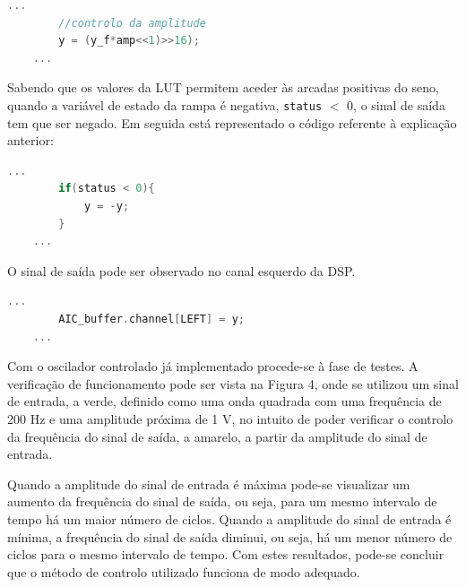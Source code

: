 \documentclass[11pt]{article}
\numberwithin{equation}{section}
\begin{document}
\begin{lstlisting}[language=C]
	...
		//controlo da amplitude
		y = (y_f*amp<<1)>>16);
	...
\end{lstlisting}

Sabendo que os valores da LUT permitem aceder às arcadas positivas do seno, quando a variável de estado da rampa é negativa, \texttt{status} $<$ 0, o sinal de saída tem que ser negado. Em seguida está representado o código referente à explicação anterior:

\begin{lstlisting}[language=C]
	...
		if(status < 0){
			y = -y;
		}
	...
\end{lstlisting}

O sinal de saída pode ser observado no canal esquerdo da DSP.

\begin{lstlisting}[language=C]
	...
		AIC_buffer.channel[LEFT] = y;
	...
\end{lstlisting}

Com o oscilador controlado já implementado procede-se à fase de testes. A verificação de funcionamento pode ser vista na Figura 4, onde se utilizou um sinal de entrada, a verde, definido como uma onda quadrada com uma frequência de 200 Hz e uma amplitude próxima de 1 V, no intuito de poder verificar o controlo da frequência do sinal de saída, a amarelo, a partir da amplitude do sinal de entrada. 

Quando a amplitude do sinal de entrada é máxima pode-se visualizar um aumento da frequência do sinal de saída, ou seja, para um mesmo intervalo de tempo há um maior número de ciclos. Quando a amplitude do sinal de entrada é mínima, a frequência do sinal de saída diminui, ou seja, há um menor número de ciclos para o mesmo intervalo de tempo. Com estes resultados, pode-se concluir que o método de controlo utilizado funciona de modo adequado.

\end{document}
